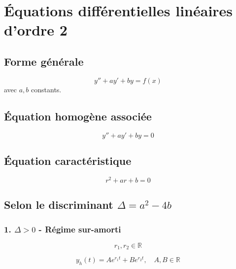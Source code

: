 \documentclass[a4paper,11pt]{article}
\begin{document}
        \newpage

    \section*{Équations différentielles linéaires d'ordre 2}

        \subsection*{Forme générale}
            \[
            y'' + ay' + by = f(x)
            \]
            avec $a, b$ constants.

        \subsection*{Équation homogène associée}
            \[
            y'' + ay' + by = 0
            \]

        \subsection*{Équation caractéristique}
            \[
            r^2 + ar + b = 0
            \]

        \subsection*{Selon le discriminant $\Delta = a^2 - 4b$}

            \subsubsection*{1. $\Delta > 0$ - Régime sur-amorti}
                
                $$ r_1, r_2 \in \mathbb{R}$$
                
                $$ y_h (t) = A e^{r_1 t} + B e^{r_2 t}, \quad A, B \in \mathbb{R} $$

                \begin{center}
                \end{center}
\end{document}
